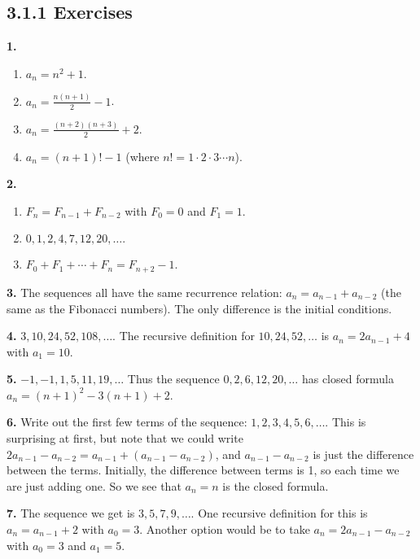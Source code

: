 \documentclass[10pt,]{book}
\theoremstyle{plain}
\theoremstyle{definition}
\theoremstyle{definition}
\theoremstyle{definition}
\numberwithin{equation}{chapter}
\begin{document}
\subsection*{3.1.1 Exercises}
\noindent\textbf{1.}\quad{}\leavevmode%
\begin{enumerate}[label=(\alph*)]
\item\hypertarget{li-856}{}\(a_n = n^2 + 1\).%
\item\hypertarget{li-857}{}\(a_n = \frac{n(n+1)}{2} - 1\).%
\item\hypertarget{li-858}{}\(a_n = \frac{(n+2)(n+3)}{2} + 2\).%
\item\hypertarget{li-859}{}\(a_n = (n+1)! - 1\) (where \(n! = 1 \cdot 2 \cdot 3 \cdots n\)).%
\end{enumerate}
\par\smallskip
\noindent\textbf{2.}\quad{}\leavevmode%
\begin{enumerate}[label=(\alph*)]
\item\hypertarget{li-863}{}\(F_n = F_{n-1} + F_{n-2}\) with \(F_0 = 0\) and \(F_1 = 1\).%
\item\hypertarget{li-864}{}\(0, 1, 2, 4, 7, 12, 20, \ldots.\)%
\item\hypertarget{li-865}{}\(F_0 + F_1 + \cdots + F_n = F_{n+2} - 1.\)%
\end{enumerate}
\par\smallskip
\noindent\textbf{3.}\quad{}
          The sequences all have the same recurrence relation: \(a_n = a_{n-1} + a_{n-2}\) (the same as the Fibonacci numbers). The only difference is the initial conditions.
\par\smallskip
\noindent\textbf{4.}\quad{}
          \(3, 10, 24, 52, 108,\ldots\). The recursive definition for \(10, 24, 52, \ldots\) is \(a_n = 2a_{n-1} + 4\) with \(a_1 = 10\).
\par\smallskip
\noindent\textbf{5.}\quad{}
          \(-1, -1, 1, 5, 11, 19,\ldots\) Thus the sequence \(0, 2, 6, 12, 20,\ldots\) has closed formula \(a_n = (n+1)^2 - 3(n+1) + 2\).
\par\smallskip
\noindent\textbf{6.}\quad{}
          Write out the first few terms of the sequence: \(1, 2, 3, 4, 5, 6,\ldots\). This is surprising at first, but note that we could write \(2a_{n-1} - a_{n-2} = a_{n-1} + (a_{n-1} -a_{n-2})\), and \(a_{n-1} - a_{n-2}\) is just the difference between the terms. Initially, the difference between terms is 1, so each time we are just adding one. So we see that \(a_n = n\) is the closed formula.
\par\smallskip
\noindent\textbf{7.}\quad{}
          The sequence we get is \(3, 5, 7, 9, \ldots\). One recursive definition for this is \(a_n = a_{n-1} + 2\) with \(a_0 = 3\). Another option would be to take \(a_n = 2a_{n-1} - a_{n-2}\) with \(a_0 = 3\) and \(a_1 = 5\).
\par\smallskip
\end{document}
